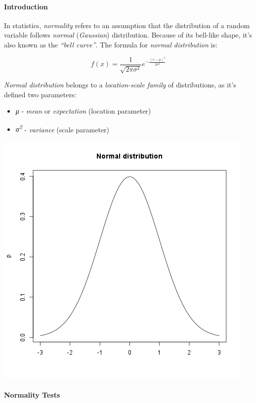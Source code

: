 \documentclass[]{article}
\makeatletter
\def\maxwidth{\ifdim\Gin@nat@width>\linewidth\linewidth
\else\Gin@nat@width\fi}
\let\Oldincludegraphics\includegraphics
\renewcommand{\includegraphics}[1]{\Oldincludegraphics[width=\maxwidth]{#1}}
\makeatother
\begin{document}
\paragraph{Introduction}

In statistics, \emph{normality} refers to an assumption that the
distribution of a random variable follows \emph{normal}
(\emph{Gaussian}) distribution. Because of its bell-like shape, it's
also known as the \emph{``bell curve''}. The formula for \emph{normal
distribution} is:

\[f(x) = \frac{1}{\sqrt{2\pi{}\sigma{}^2}} e^{-\frac{(x-\mu{})^2}{2\sigma{}^2}}\]

\emph{Normal distribution} belongs to a \emph{location-scale family} of
distributions, as it's defined two parameters:

\begin{itemize}
\item
  \emph{μ} - \emph{mean} or \emph{expectation} (location parameter)
\item
  \emph{σ\textsuperscript{2}} - \emph{variance} (scale parameter)
\end{itemize}
\href{806ea97c59e1a12d4acae4968957aaa9-hires.png}{\includegraphics{806ea97c59e1a12d4acae4968957aaa9.png}}

\paragraph{Normality Tests}
\end{document}

